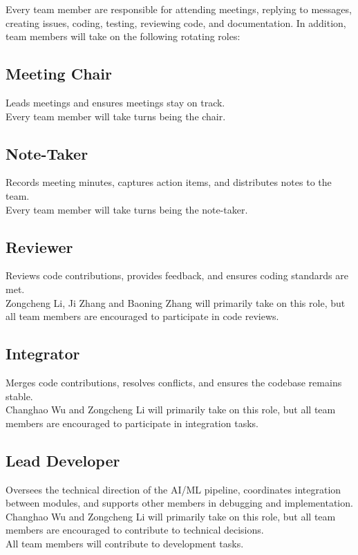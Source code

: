 \documentclass{article}
\begin{document}
Every team member are responsible for attending meetings, replying to messages, creating issues, coding, testing,
reviewing code, and documentation.  In addition, team members will take on
the following rotating roles:

\subsection*{Meeting Chair}
Leads meetings and ensures meetings stay on track. \\
Every team member will take turns being the chair.

\subsection*{Note-Taker}
Records meeting minutes, captures action items, and distributes notes to the team. \\
Every team member will take turns being the note-taker.

\subsection*{Reviewer}
Reviews code contributions, provides feedback, and ensures coding standards are met. \\
Zongcheng Li, Ji Zhang and Baoning Zhang will primarily take on this role, but all team members are encouraged to participate in code reviews.

\subsection*{Integrator}
Merges code contributions, resolves conflicts, and ensures the codebase remains stable. \\
Changhao Wu and Zongcheng Li will primarily take on this role, but all team members are encouraged to participate in integration tasks.

\subsection*{Lead Developer}
Oversees the technical direction of the AI/ML pipeline, coordinates integration 
between modules, and supports other members in debugging and implementation. \\
Changhao Wu and Zongcheng Li will primarily take on this role, but all team members are encouraged to contribute to technical decisions. \\
All team members will contribute to development tasks.
\end{document}
